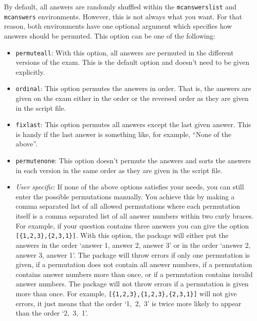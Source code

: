 \documentclass{article}
\begin{document}
By default, all answers are randomly shuffled within the \verb$mcanswerslist$ and \verb$mcanswers$ environments. However, this is not always what you want. For that reason, both environments have one optional argument which specifies how answers should be permuted. This option can be one of the following:   
\begin{itemize}
 \item \verb$permuteall$:
       With this option, all answers are permuted in the different versions of the exam. This is the default option and doesn't need to be given explicitly.
 \item \verb$ordinal$:
       This option permutes the answers in order. That is, the answers are given on the exam either in the order or the reversed order as they are given in the script file.
 \item \verb$fixlast$:
       This option permutes all answers except the last given answer. This is handy if the last answer is something like, for example, ``None of the above''. 
 \item \verb$permutenone$:
       This option doesn't permute the answers and sorts the answers in each version in the same order as they are given in the script file.
 \item \emph{User specific}:
       If none of the above options satisfies your needs, you can still enter the possible permutations manually. You achieve this by making a comma separated list of all allowed permutations where each permutation itself is a comma separated list of all answer numbers within two curly braces. For example, if your question contains three answers you can give the option \verb$[{1,2,3},{2,3,1}]$. With this option, the package will either put the answers in the order `answer 1, answer 2, answer 3' or in the order `answer 2, answer 3, answer 1'. The package will throw errors if only one permutation is given, if a permutation does not contain all answer numbers, if a permutation contains answer numbers more than once, or if a permutation contains invalid answer numbers. The package will not throw errors if a permutation is given more than once. For example, \verb$[{1,2,3},{1,2,3},{2,3,1}]$ will not give errors, it just means that the order `1,~2,~3' is twice more likely to appear than the order `2,~3,~1'.
\end{itemize}
\end{document}
